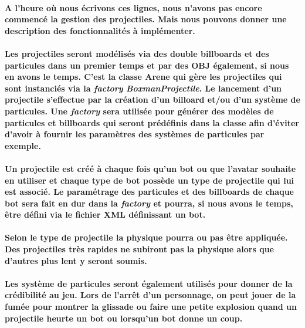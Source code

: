 \paragraph{A l'heure où nous écrivons ces lignes, nous n'avons pas encore commencé la gestion des projectiles. Mais nous pouvons donner une description des fonctionnalités à implémenter.}

\paragraph{Les projectiles seront modélisés via des double billboards et des particules dans un premier temps et par des OBJ également, si nous en avons le temps. C'est la classe Arene qui gère les projectiles qui sont instanciés via la \textit{factory} \textit{BoxmanProjectile}. Le lancement d'un projectile s'effectue par la création d'un billoard et/ou d'un système de particules. Une \textit{factory} sera utilisée pour générer des modèles de particules et billboards qui seront prédéfinis dans la classe afin d'éviter d'avoir à fournir les paramètres des systèmes de particules par exemple.}

\paragraph{Un projectile est créé à chaque fois qu'un bot ou que l'avatar souhaite en utiliser et chaque type de bot possède un type de projectile qui lui est associé. Le paramétrage des particules et des billboards de chaque bot sera fait en dur dans la \textit{factory} et pourra, si nous avons le temps, être défini via le fichier XML définissant un bot.}

\paragraph{Selon le type de projectile la physique pourra ou pas être appliquée. Des projectiles très rapides ne subiront pas la physique alors que d'autres plus lent y seront soumis.}

\paragraph{Les système de particules seront également utilisés pour donner de la crédibilité au jeu. Lors de l'arrêt d'un personnage, on peut jouer de la fumée pour montrer la glissade ou faire une petite explosion quand un projectile heurte un bot ou lorsqu'un bot donne un coup.}


